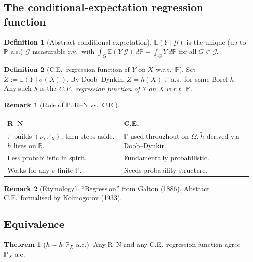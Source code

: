 \documentclass[12pt, a4paper]{article}
\theoremstyle{definition}
\newtheorem{definition}{Definition}[section]
\newtheorem{theorem}{Theorem}[section]
\newtheorem{remark}{Remark}[section]
\newcommand{\E}{\mathbb{E}}
\newcommand{\R}{\mathbb{R}}
\newcommand{\Prob}{\mathbb{P}}
\newcommand{\sG}{\mathcal{G}}
\begin{document}
\subsection{The conditional-expectation regression function}

\begin{definition}[Abstract conditional expectation]\label{def:absCE}
$\E(Y\mid\sG)$ is the unique (up to $\Prob$-a.s.) $\sG$-measurable
r.v.\ with $\int_G\E(Y|\sG)\,d\Prob=\int_G Y\,d\Prob$
for all $G\in\sG$.
\end{definition}

\begin{definition}[C.E.\ regression function of $Y$ on $X$
  w.r.t.\ $\Prob$]\label{def:CEregfun}
Set $Z:=\E(Y\mid\sigma(X))$.  By Doob--Dynkin, $Z=\tilde h(X)$
$\Prob$-a.s.\ for some Borel $\tilde h$.
Any such $\tilde h$ is the \emph{C.E.\ regression function of $Y$
on $X$ w.r.t.\ $\Prob$}.
\end{definition}

\begin{remark}[Role of $\Prob$: R--N vs.\ C.E.]
\begin{center}
\renewcommand{\arraystretch}{1.3}
\begin{tabular}{@{}p{5cm}p{5cm}@{}}
\toprule
\textbf{R--N} & \textbf{C.E.} \\
\midrule
$\Prob$ builds $(\nu,\Prob_X)$, then steps aside.
$h$ lives on $\R$.
& $\Prob$ used throughout on $\Omega$.
$\tilde h$ derived via Doob--Dynkin. \\
Less probabilistic in spirit. & Fundamentally probabilistic. \\
Works for any $\sigma$-finite $\Prob$. & Needs probability structure. \\
\bottomrule
\end{tabular}
\end{center}
\end{remark}

\begin{remark}[Etymology]
``Regression'' from Galton (1886).
Abstract C.E.\ formalised by Kolmogorov (1933).
\end{remark}

\subsection{Equivalence}

\begin{theorem}[$h=\tilde h$ $\Prob_X$-a.e.]\label{thm:equiv}
Any R--N and any C.E.\ regression function agree $\Prob_X$-a.e.
\end{theorem}
\end{document}
